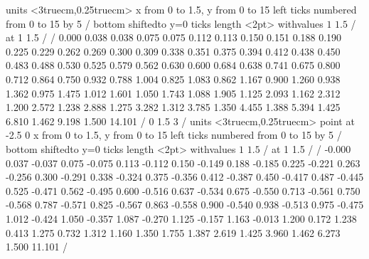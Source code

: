 \figure
\vbox{\beginpicture
\normalgraphs
\sevenpoint
\setcoordinatesystem units <3truecm,0.25truecm>
\setplotarea x from 0 to 1.5, y from 0 to 15
\axis left ticks numbered from 0 to 15 by 5 /
\axis bottom shiftedto y=0 ticks length <2pt> withvalues {$1$} {$1.5$} / at
1 1.5 / /
 0.000 0.038 0.038 0.075 0.075 0.112 0.113 0.150 0.151 
0.188 0.190 0.225 0.229 0.262 0.269 0.300 0.309 0.338 0.351 
0.375 0.394 0.412 0.438 0.450 0.483 0.488 0.530 0.525 0.579 
0.562 0.630 0.600 0.684 0.638 0.741 0.675 0.800 0.712 0.864 
0.750 0.932 0.788 1.004 0.825 1.083 0.862 1.167 0.900 1.260 
0.938 1.362 0.975 1.475 1.012 1.601 1.050 1.743 1.088 1.905 
1.125 2.093 1.162 2.312 1.200 2.572 1.238 2.888 1.275 3.282 
1.312 3.785 1.350 4.455 1.388 5.394 1.425 6.810 1.462 9.198 
1.500 14.101  /
\setlinear
{} 0 1.5 3 /
\setcoordinatesystem units <3truecm,0.25truecm> point at -2.5 0
\setplotarea x from 0 to 1.5, y from 0 to 15
\axis left ticks numbered from 0 to 15 by 5 /
\axis bottom shiftedto y=0 ticks length <2pt> withvalues {$1$} {$1.5$} / at
1 1.5 / /
 -0.000 0.037 -0.037 0.075 -0.075 0.113 -0.112 0.150 -0.149
0.188 -0.185 0.225 -0.221 0.263 -0.256 0.300 -0.291 0.338 -0.324
0.375 -0.356 0.412 -0.387 0.450 -0.417 0.487 -0.445 0.525 -0.471
0.562 -0.495 0.600 -0.516 0.637 -0.534 0.675 -0.550 0.713 -0.561
0.750 -0.568 0.787 -0.571 0.825 -0.567 0.863 -0.558 0.900 -0.540
0.938 -0.513 0.975 -0.475 1.012 -0.424 1.050 -0.357 1.087 -0.270
1.125 -0.157 1.163 -0.013 1.200 0.172 1.238 0.413 1.275 0.732
1.312 1.160 1.350 1.755 1.387 2.619 1.425 3.960 1.462 6.273
1.500 11.101 /
\endpicture}


